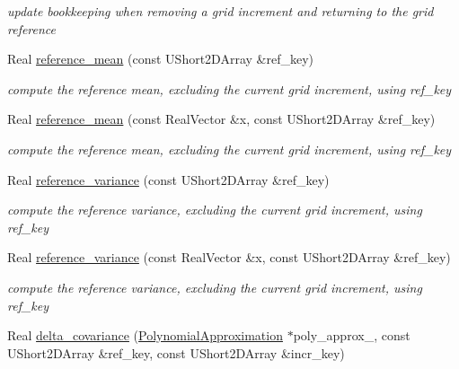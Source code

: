 \begin{DoxyCompactItemize}
\begin{DoxyCompactList}\small\item\em update bookkeeping when removing a grid increment and returning to the grid reference \end{DoxyCompactList}\item 
Real \hyperlink{classPecos_1_1HierarchInterpPolyApproximation_af5705082b10f5d61987169b5a84f27dd}{reference\+\_\+mean} (const U\+Short2\+D\+Array \&ref\+\_\+key)\label{classPecos_1_1HierarchInterpPolyApproximation_af5705082b10f5d61987169b5a84f27dd}

\begin{DoxyCompactList}\small\item\em compute the reference mean, excluding the current grid increment, using ref\+\_\+key \end{DoxyCompactList}\item 
Real \hyperlink{classPecos_1_1HierarchInterpPolyApproximation_a9cb0a71afa77132fae9eac948c782880}{reference\+\_\+mean} (const Real\+Vector \&x, const U\+Short2\+D\+Array \&ref\+\_\+key)\label{classPecos_1_1HierarchInterpPolyApproximation_a9cb0a71afa77132fae9eac948c782880}

\begin{DoxyCompactList}\small\item\em compute the reference mean, excluding the current grid increment, using ref\+\_\+key \end{DoxyCompactList}\item 
Real \hyperlink{classPecos_1_1HierarchInterpPolyApproximation_a6a25f632a3b1b91ac183dd55320eaad7}{reference\+\_\+variance} (const U\+Short2\+D\+Array \&ref\+\_\+key)\label{classPecos_1_1HierarchInterpPolyApproximation_a6a25f632a3b1b91ac183dd55320eaad7}

\begin{DoxyCompactList}\small\item\em compute the reference variance, excluding the current grid increment, using ref\+\_\+key \end{DoxyCompactList}\item 
Real \hyperlink{classPecos_1_1HierarchInterpPolyApproximation_a5a884802084505eb75bda915e649e9eb}{reference\+\_\+variance} (const Real\+Vector \&x, const U\+Short2\+D\+Array \&ref\+\_\+key)\label{classPecos_1_1HierarchInterpPolyApproximation_a5a884802084505eb75bda915e649e9eb}

\begin{DoxyCompactList}\small\item\em compute the reference variance, excluding the current grid increment, using ref\+\_\+key \end{DoxyCompactList}\item 
Real \hyperlink{classPecos_1_1HierarchInterpPolyApproximation_a6a1e7ea9782d28b034be7aedf7197c7d}{delta\+\_\+covariance} (\hyperlink{classPecos_1_1PolynomialApproximation}{Polynomial\+Approximation} $\ast$poly\+\_\+approx\+\_, const U\+Short2\+D\+Array \&ref\+\_\+key, const U\+Short2\+D\+Array \&incr\+\_\+key)\label{classPecos_1_1HierarchInterpPolyApproximation_a6a1e7ea9782d28b034be7aedf7197c7d}


\end{DoxyCompactItemize}

